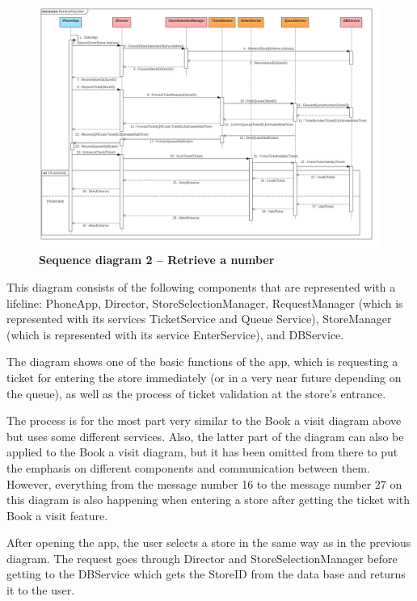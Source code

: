 \begin{figure}[!h]
\centering
\includegraphics[width=\textwidth]{Images/SequenceDiagramComponents2_RetrieveANumber}
\caption{\label{fig:seqdiagram2}\textbf{Sequence diagram 2 – Retrieve a number}}
\end{figure}

This diagram consists of the following components that are represented with a lifeline: PhoneApp, Director, StoreSelectionManager, RequestManager (which is represented with its services TicketService and Queue Service), StoreManager (which is represented with its service EnterService), and DBService.  

  

The diagram shows one of the basic functions of the app, which is requesting a ticket for entering the store immediately (or in a very near future depending on the queue), as well as the process of ticket validation at the store's entrance.   

  

The process is for the most part very similar to the Book a visit diagram above but uses some different services. Also, the latter part of the diagram can also be applied to the Book a visit diagram, but it has been omitted from there to put the emphasis on different components and communication between them. However, everything from the message number 16 to the message number 27 on this diagram is also happening when entering a store after getting the ticket with Book a visit feature.   

  

After opening the app, the user selects a store in the same way as in the previous diagram. The request goes through Director and StoreSelectionManager before getting to the DBService which gets the StoreID from the data base and returns it to the user.  

